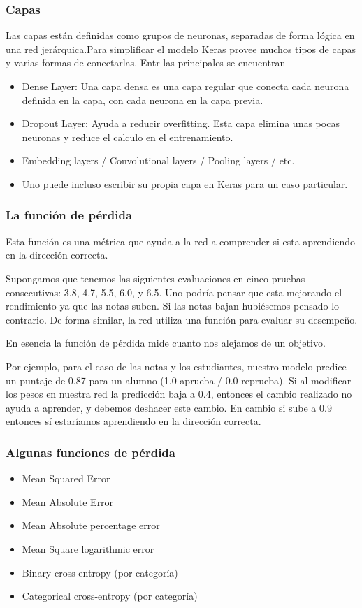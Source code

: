 \documentclass[9pt, xcolor=svgnames, dvipsnames]{beamer}
\begin{document}
\begin{frame}[fragile]
\frametitle{Capas}
Las capas est\'an definidas como grupos de neuronas, separadas de forma l\'ogica en una red jer\'arquica.Para simplificar el modelo Keras provee muchos tipos de capas y varias formas de conectarlas. Entr las principales se encuentran
\begin{itemize}
    \item Dense Layer: Una capa densa es una capa regular que conecta cada neurona definida en la capa, con cada neurona en la capa previa.
    \item Dropout Layer: Ayuda a reducir overfitting. Esta capa elimina unas pocas neuronas y reduce el calculo en el entrenamiento.
    \item Embedding layers / Convolutional layers / Pooling layers / etc.
    \item Uno puede incluso escribir su propia capa en Keras para un caso particular.
\end{itemize}
\end{frame}


\begin{frame}[fragile]
\frametitle{La funci\'on de p\'erdida}
Esta funci\'on es una m\'etrica que ayuda a la red a comprender si esta aprendiendo en la direcci\'on correcta.

Supongamos que tenemos las siguientes evaluaciones en cinco pruebas consecutivas: 3.8, 4.7, 5.5, 6.0, y 6.5. Uno podr\'ia pensar que esta mejorando el rendimiento ya que las notas suben. Si las notas bajan hubi\'esemos pensado lo contrario. De forma similar, la red utiliza una funci\'on para evaluar su desempe\~no.

\begin{tcolorbox}
En esencia la funci\'on de p\'erdida mide cuanto nos alejamos de un objetivo.
\end{tcolorbox}

Por ejemplo, para el caso de las notas y los estudiantes, nuestro modelo predice un puntaje de 0.87 para un alumno (1.0 aprueba / 0.0 reprueba). Si al modificar los pesos en nuestra red la predicci\'on baja a 0.4, entonces el cambio realizado no ayuda a aprender, y debemos deshacer este cambio. En cambio si sube a 0.9 entonces s\'i estar\'iamos aprendiendo en la direcci\'on correcta.

\end{frame}

\begin{frame}[fragile]
\frametitle{Algunas funciones de p\'erdida}
\begin{itemize}
    \item Mean Squared Error
    \item Mean Absolute Error
    \item Mean Absolute percentage error
    \item Mean Square logarithmic error
    \item Binary-cross entropy (por categor\'ia)
    \item Categorical cross-entropy (por categor\'ia)
\end{itemize}
\end{frame}
\end{document}
